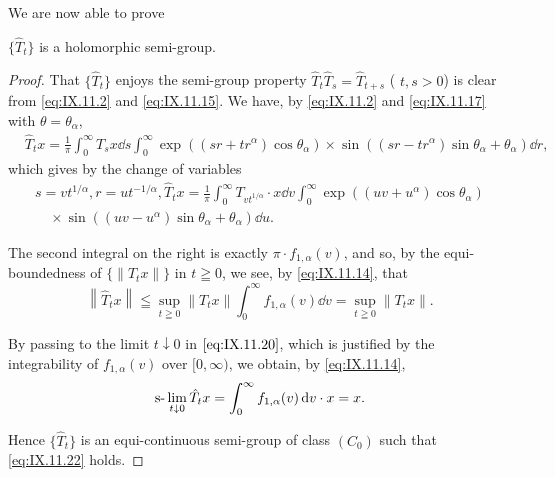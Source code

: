 We are now able to prove 

\begin{theorem}\label{thm:IX.11.Theorem.1} $\{\hat{T}_t\}$ is a holomorphic semi-group. 
\end{theorem}

\begin{proof}
 That $\{\hat{T}_t\}$ enjoys the semi-group property $\hat{T}_t\hat{T}_s = \hat{T}_{t+s}$ ( $t, s > 0$) is clear from \eqref{eq:IX.11.2} and \eqref{eq:IX.11.15}. We have, by \eqref{eq:IX.11.2} and \eqref{eq:IX.11.17} with $\theta = \theta_{\alpha}$, 
\begin{equation}\label{eq:IX.11.20}
\begin{aligned}
&\hat {T} _{t} x = \frac {1}{\pi} \int_{0} ^{\infty} T _{s} x \dd s \int_{0} ^{\infty} \exp ((s r + t r ^{\alpha}) \cos \theta_{\alpha}) \times \sin ((s r - t r ^{\alpha}) \sin \theta_{\alpha} + \theta_{\alpha}) \dd r,
\end{aligned}
\end{equation}
which gives by the change of variables 
\begin{gather}s = v t ^{1 / \alpha}, r = u t ^{-1 / \alpha}, \hat {T} _{t} x= \frac {1}{\pi} \int_{0} ^{\infty} T _ {v t ^{1 / \alpha}} \cdot x \dd v \int_{0} ^{\infty} \exp \left((u v + u ^{\alpha}) \cos \theta_{\alpha}\right) \label{eq:IX.11.21}
\\\quad \times \sin \left((u v - u ^{\alpha}) \sin \theta_{\alpha} + \theta_{\alpha}\right) \dd u.  \tag{20'} \label{eq:IX.11.20'}
\end{gather}

The second integral on the right is exactly $\pi \cdot f_{1,\alpha}(v)$, and so, by the equi-boundedness of $\{\|T_t x\|\}$ in $t \geqq 0$, we see, by \eqref{eq:IX.11.14}, that 
\begin{equation}\label{eq:IX.11.22}
\left\| \hat {T} _{t} x \right\| \leqq \sup\limits _{t \geqq 0} \left\| T _{t} x \right\| \int_{0} ^{\infty} f _{1, \alpha} (v) \dd v = \sup\limits _{t \geqq 0} \left\| T _{t} x \right\|.
\end{equation}

By passing to the limit $t \downarrow 0$ in $\eqref{eq:IX.11.20}$, which is justified by the integrability of $f_{1,\alpha}(v)$ over $[0, \infty)$, we obtain, by \eqref{eq:IX.11.14}, 
\[
\text{s-}\lim _{t \downarrow 0} \hat {T} _{t} x = \int_{0} ^{\infty} f _{1, \alpha} (v) \mathop{}\!\mathrm{d} v \cdot x = x.
\]

Hence $\{\hat{T}_t\}$ is an equi-continuous semi-group of class $(C_0)$ such that \eqref{eq:IX.11.22} holds. 



\end{proof}
